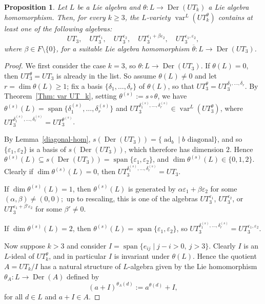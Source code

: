 \documentclass[a4paper,reqno]{amsart}
\newtheorem{proposition}[theorem]{Proposition}
\theoremstyle{definition}
\numberwithin{equation}{section}
\numberwithin{theorem}{section}
\DeclareMathOperator{\V}{var}
\DeclareMathOperator{\spn}{span}
\DeclareMathOperator{\ad}{ad}
\DeclareMathOperator{\D}{Der}
\begin{document}
\begin{proposition}\label{pro: UT_k and UT_3}
Let $L$ be a Lie algebra and $\theta:L\to\D(UT_k)$ a Lie algebra homomorphism. Then, for every $k\geq 3$, the $L$-variety $\V^L(UT_k^\theta)$
contains at least one of the following algebras:
$$
UT_3,\quad UT_3^{\varepsilon_1},\quad UT_3^{\varepsilon_2},\quad
UT_3^{\varepsilon_1+\beta\varepsilon_2},\quad UT_3^{\varepsilon_1,\varepsilon_2},
$$
where $\beta\in F\setminus\{0\}$, for a suitable Lie algebra homomorphism $\overline{\theta}:L \to \D(UT_3)$. 
\end{proposition}
\begin{proof}
We first consider the case $k=3$, so $\theta:L\to\D(UT_3)$. If $\theta(L)=0$, then $UT_3^\theta=UT_3$
is already in the list. So assume $\theta(L)\neq0$ and let $r=\dim\theta(L)\ge1$; fix a basis
$\{\delta_1,\ldots,\delta_r\}$ of $\theta(L)$, so that $UT_3^\theta=UT_3^{\delta_1,\ldots,\delta_r}$.
By Theorem~\ref{Thm: var UT_k}, setting $\theta^{(s)}:=s\circ\theta$, we have $\theta^{(s)}(L)=\spn\{\delta_1^{(s)},\ldots,\delta_r^{(s)}\}$ and 
$UT_3^{\delta_1^{(s)},\ldots,\delta_r^{(s)}} \in \V^L(UT_3^\theta)$, where $UT_3^{\delta_1^{(s)},\ldots,\delta_r^{(s)}}=UT_3^{\theta^{(s)}}$.


 By Lemma~\ref{diagonal-hom}, $s(\D(UT_3))=\{\ad_b\mid b\text{ diagonal}\}$, and so $\{\varepsilon_1,\varepsilon_2\}$ is a basis of $s(\D(UT_3))$, which therefore has dimension $2$.
Hence $\theta^{(s)}(L)\subseteq s(\D(UT_3))=
\spn\{\varepsilon_1,\varepsilon_2\}$, and $\dim\theta^{(s)}(L)\in\{0,1,2\}$.
Clearly if $\dim\theta^{(s)}(L)=0$, then $UT_3^{\delta_1^{(s)},\ldots,\delta_r^{(s)}}=UT_3.$ 

If $\dim\theta^{(s)}(L)=1$, then
$\theta^{(s)}(L)$ is generated by $\alpha\varepsilon_1+\beta\varepsilon_2$ for some
$(\alpha,\beta)\ne(0,0);$
 up to rescaling, this is one of the algebras $UT_3^{\varepsilon_1}$, $UT_3^{\varepsilon_2}$,
or $UT_3^{\varepsilon_1+\beta'\varepsilon_2}$ for some $\beta'\neq0$.

If $\dim\theta^{(s)}(L)=2$, then
$\theta^{(s)}(L)=\spn\{\varepsilon_1,\varepsilon_2\}$, so $UT_3^{\delta_1^{(s)},\ldots,\delta_r^{(s)}}
=UT_3^{\varepsilon_1,\varepsilon_2}$.

Now suppose $k>3$ and consider $I=\spn\{e_{ij}\mid j-i  >0  ,\ j>3\}$.   Clearly $I$ is an $L$-ideal of $UT_k^{\theta}$, and in particular $I$ is invariant under $\theta(L)$.   Hence the quotient $A=UT_k/I$ has a natural structure of $L$-algebra given by the Lie homomorphism $\theta_A:L\to\D(A)$ defined by
$$
(a+I)^{\theta_A(d)}:=a^{\theta(d)}+I,
$$
for all $d\in L$ and $a+I\in A$.





\end{proof}
\end{document}
